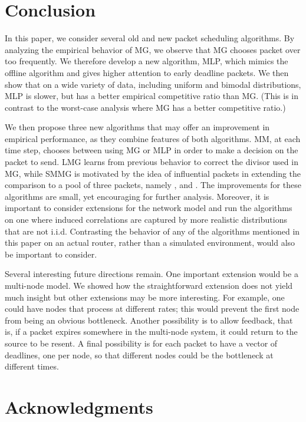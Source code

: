 \documentclass[oribibl]{llncs}
\begin{document}
\section {Conclusion}
\label{sec:Conc}
In this paper, we consider several old and new packet scheduling algorithms.
By 
analyzing the empirical behavior of MG, we observe that MG
chooses packet  over  too frequently. We
therefore develop a new algorithm, MLP, which
mimics the offline algorithm and gives higher attention to early
deadline packets.  We then show that on a wide variety of data, including
uniform and bimodal distributions, 
MLP is slower, but has a better empirical competitive ratio than MG. (This is in contrast to
the worst-case analysis where MG has a better competitive ratio.)

We then propose three new algorithms that may offer an improvement in
empirical performance, as they combine features of both
algorithms. MM, at each time step, chooses between using MG or MLP in
order to make a decision on the packet to send. LMG learns from
previous behavior to correct the divisor used in MG, while SMMG is
motivated by the idea of influential packets in extending the
comparison to a pool of three packets, namely ,  and . The
improvements for these algorithms are small, yet encouraging for
further analysis. Moreover, it is important to consider extensions for
the network model and run the algorithms on one where induced
correlations are captured by more realistic distributions that are not
i.i.d.  Contrasting the behavior of any of the algorithms mentioned in
this paper on an actual router, rather than a simulated environment,
would also be important to consider.


Several interesting future directions remain.  One important extension would
be a multi-node model.  We showed how the straightforward extension does not
yield much insight but other extensions may be more interesting.
For example, one could have nodes that process at different rates; this would
prevent the first node from being an obvious bottleneck.
Another possibility is to allow feedback, that is, if a packet expires somewhere in the multi-node system, it could return to the source 
to be resent.
A final  possibility is for each packet to have a vector of deadlines, one per node, so
that different nodes could be the bottleneck at different times.


\section*{Acknowledgments}
\end{document}
